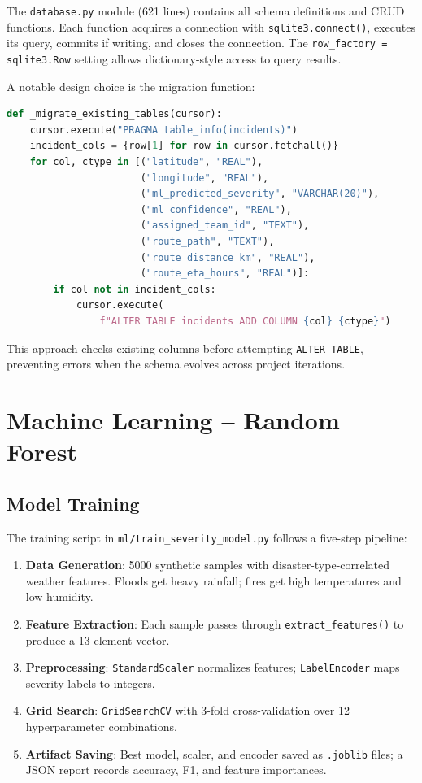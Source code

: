 The \texttt{database.py} module (621 lines) contains all schema definitions and CRUD functions. Each function acquires a connection with \texttt{sqlite3.connect()}, executes its query, commits if writing, and closes the connection. The \texttt{row\_factory = sqlite3.Row} setting allows dictionary-style access to query results.

A notable design choice is the migration function:

\begin{lstlisting}[style=codestyle, language=Python, caption=Safe column migration for existing tables]
def _migrate_existing_tables(cursor):
    cursor.execute("PRAGMA table_info(incidents)")
    incident_cols = {row[1] for row in cursor.fetchall()}
    for col, ctype in [("latitude", "REAL"),
                       ("longitude", "REAL"),
                       ("ml_predicted_severity", "VARCHAR(20)"),
                       ("ml_confidence", "REAL"),
                       ("assigned_team_id", "TEXT"),
                       ("route_path", "TEXT"),
                       ("route_distance_km", "REAL"),
                       ("route_eta_hours", "REAL")]:
        if col not in incident_cols:
            cursor.execute(
                f"ALTER TABLE incidents ADD COLUMN {col} {ctype}")
\end{lstlisting}

This approach checks existing columns before attempting \texttt{ALTER TABLE}, preventing errors when the schema evolves across project iterations.

\section{Machine Learning -- Random Forest}
\label{sec:impl_ml}

\subsection{Model Training}

The training script in \texttt{ml/train\_severity\_model.py} follows a five-step pipeline:

\begin{enumerate}[leftmargin=*]
    \item \textbf{Data Generation}: 5000 synthetic samples with disaster-type-correlated weather features. Floods get heavy rainfall; fires get high temperatures and low humidity.
    \item \textbf{Feature Extraction}: Each sample passes through \texttt{extract\_features()} to produce a 13-element vector.
    \item \textbf{Preprocessing}: \texttt{StandardScaler} normalizes features; \texttt{LabelEncoder} maps severity labels to integers.
    \item \textbf{Grid Search}: \texttt{GridSearchCV} with 3-fold cross-validation over 12 hyperparameter combinations.
    \item \textbf{Artifact Saving}: Best model, scaler, and encoder saved as \texttt{.joblib} files; a JSON report records accuracy, F1, and feature importances.
\end{enumerate}

